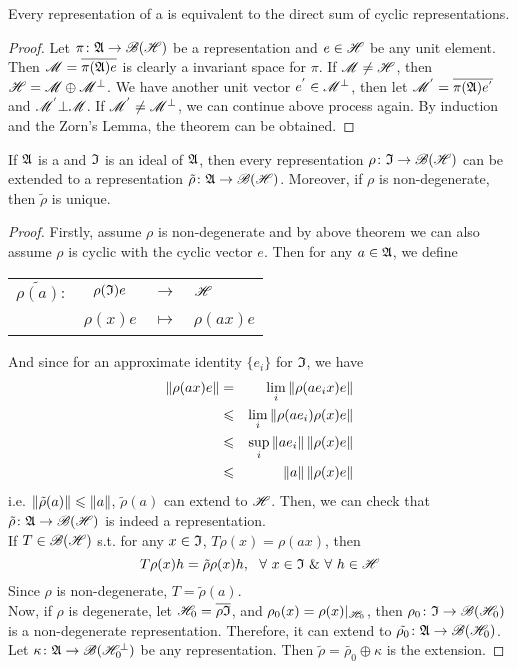 \documentclass[a4paper,11pt]{report}
\begin{document}
\begin{thm}
	Every representation of a \Cs is equivalent to the direct sum of cyclic representations.
\end{thm}
\begin{proof}
	Let $\pi \colon \mathfrak{A} \rightarrow \mathscr{B(H)}$ be a representation and $e \in \mathscr{H}$ be any unit element. Then $\mathscr{M} = \overline{\pi(\mathfrak{A})e}$ is clearly a invariant space for $\pi$. If $\mathscr{M} \neq \mathscr{H}$, then $\mathscr{H} = \mathscr{M} \oplus \mathscr{M}^{\bot}$. We have another unit vector $e^{'} \in \mathscr{M}^{\bot}$, then let $\mathscr{M}^{'} = \overline{\pi(\mathfrak{A})e^{'}}$ and $\mathscr{M}^{'} \bot \mathscr{M}$. If $\mathscr{M}^{'} \neq \mathscr{M}^{\bot}$, we can continue above process again. By induction and the Zorn's Lemma, the theorem can be obtained.
\end{proof}

\begin{thm} \label{thm8}
	If $\mathfrak{A}$ is a \Cs and $\mathfrak{I}$ is an ideal of $\mathfrak{A}$, then every representation $\rho \colon \mathfrak{I} \rightarrow \mathscr{B(H)}$ can be extended to a representation $\tilde{\rho} \colon \mathfrak{A} \rightarrow \mathscr{B(H)}$. Moreover, if $\rho$ is non-degenerate, then $\tilde{\rho}$ is unique.
\end{thm}
\begin{proof}
	Firstly, assume $\rho$ is non-degenerate and by above theorem we can also assume $\rho$ is cyclic with the cyclic vector $e$. Then for any $a \in \mathfrak{A}$, we define
	\begin{center}
		\begin{tabular}{l c c l}
			$\tilde{\rho(a)} \colon$ & $\rho(\mathfrak{I})e$ & $\longrightarrow$ & $\mathscr{H}$ \\
			~ & $\rho(x)e$ & $\longmapsto$ & $\rho(ax)e$
		\end{tabular}
	\end{center}
	And since for an approximate identity $\{e_i\}$ for $\mathfrak{I}$, we have
	\begin{eqnarray*}
		\left\lVert\rho(ax)e\right\lVert &=& \lim_{i} \left\lVert\rho(ae_ix)e\right\lVert \\
		&\leqslant& \lim_{i} \left\lVert\rho(ae_i)\rho(x)e\right\lVert \\
		&\leqslant& \sup_{i} \left\lVert ae_i\right\lVert \left\lVert\rho(x)e\right\lVert \\
		&\leqslant& \left\lVert a\right\lVert \left\lVert\rho(x)e\right\lVert
	\end{eqnarray*}
	i.e. $\left\lVert\tilde{\rho}(a)\right\lVert \leqslant \left\lVert a\right\lVert$, $\tilde{\rho}(a)$ can extend to $\mathscr{H}$. Then, we can check that $\tilde{\rho} \colon \mathfrak{A} \rightarrow \mathscr{B(H)}$ is indeed a representation. \\
	If $T \in \mathscr{B(H)}$ s.t. for any $x \in \mathfrak{I}$, $T\rho(x) = \rho(ax)$, then
	\begin{equation*}
		T\rho(x)h = \tilde{\rho}\rho(x)h,~~ \forall~ x \in \mathfrak{I} ~\&~ \forall~ h \in \mathscr{H}
	\end{equation*}
	Since $\rho$ is non-degenerate, $T=\tilde{\rho}(a)$.\\
	Now, if $\rho$ is degenerate, let $\mathscr{H}_0 = \overline{\rho{\mathfrak{I}}}$, and $\rho_0(x) = \rho(x)|_{\mathscr{H}_0}$, then $\rho_0 \colon \mathfrak{I} \rightarrow \mathscr{B}(\mathscr{H}_0)$ is a non-degenerate representation. Therefore, it can extend to $\tilde{\rho_0} \colon \mathfrak{A} \rightarrow \mathscr{B}(\mathscr{H}_0)$. Let $\kappa \colon \mathfrak{A} \rightarrow \mathscr{B}(\mathscr{H}_0^{\bot})$ be any representation. Then $\tilde{\rho} = \tilde{\rho_0} \oplus \kappa$ is the extension.
\end{proof}
\end{document}
